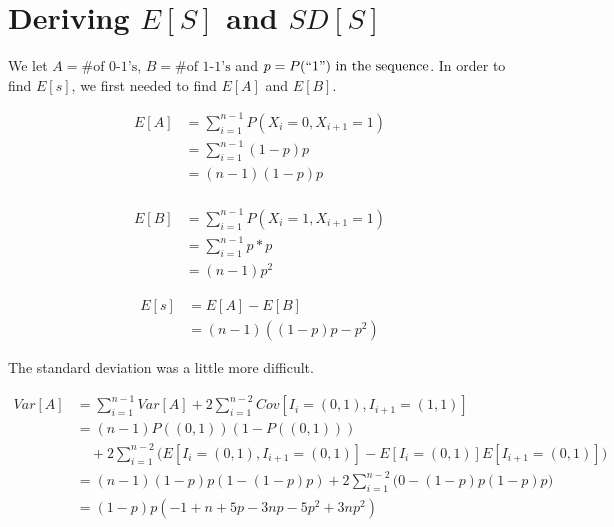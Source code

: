 \documentclass[12pt]{article}
\begin{document}



\appendix
	\section{Deriving \(E[S]\) and \(SD[S]\)}
	\label{math}
	We let \(A = \text{\# of
    0-1's}\), \(B=\text{\# of 1-1's}\) and \(p=P(``1")\text{ in the sequence}\).
    In order to find \(E[s]\), we first needed to find \(E[A]\) and
    \(E[B]\).

    \begin{equation*}
        \begin{split}
        E[A]& =\sum_{i=1}^{n-1}P(X_i=0,X_{i+1}=1) \\
            & =\sum_{i=1}^{n-1}(1-p)p \\
            & =(n-1)(1-p)p \\
        \end{split}
    \end{equation*}

    \begin{equation*}
        \begin{split}
        E[B]& =\sum_{i=1}^{n-1}P(X_i=1,X_{i+1}=1) \\
            & =\sum_{i=1}^{n-1}p*p \\
            & =(n-1)p^2
        \end{split}
    \end{equation*}

    \begin{equation*}
        \begin{split}
        E[s]& =E[A]-E[B] \\
                  & =(n-1)\left((1-p)p-p^2\right)
        \end{split}
    \end{equation*}

    The standard deviation was a little more difficult.  

    \begin{equation*}
        \begin{split}
        Var[A]& =\sum_{i=1}^{n-1}Var[A]+2\sum_{i=1}^{n-2}Cov[I_i=(0,1),I_{i+1}=
                 (1,1)] \\
              & =(n-1)P((0,1))(1-P((0,1))) \\
              & \quad +2\sum_{i=1}^{n-2}\bigg(E[I_i=(0,1),I_{i+1}=(0,1)]-E[I_i=
                (0,1)]E[I_{i+1}=(0,1)]\bigg) \\
              & =(n-1)(1-p)p(1-(1-p)p)+2\sum_{i=1}^{n-2}\bigg(0-(1-p)p(1-p)p
                \bigg) \\
              & =(1-p)p(-1+n+5p-3np-5p^2+3np^2)
        \end{split}
    \end{equation*}
\end{document}
